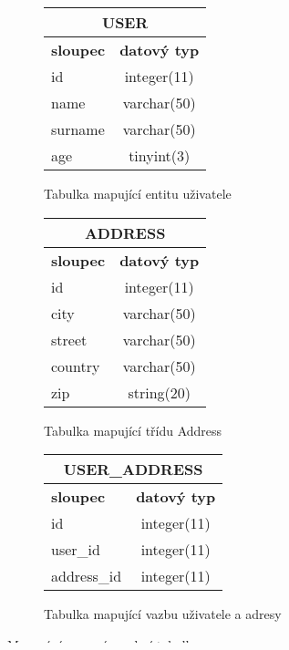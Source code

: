 \begin{figure}[!h]
\begin{subfigure}[b]{0.3\textwidth}
  \caption{Tabulka mapující entitu uživatele}
  \label{tab:user:bt}
    \centering
    \begin{tabular}{|l|c|}
       \hline
       \multicolumn{2}{|c|}{\textbf{USER}} \\
       \hline    
       \textbf{sloupec} & \textbf{datový typ} \\
       \hline
       id & integer(11) \\
       \hline
       name & varchar(50) \\
       \hline
       surname & varchar(50) \\
       \hline
       age & tinyint(3) \\
       \hline
    \end{tabular}
\end{subfigure}
\begin{subfigure}[b]{0.3\textwidth}
  \caption{Tabulka mapující třídu Address}
  \label{tab:address:bt}
    \centering
    \begin{tabular}{|l|c|}
       \hline
       \multicolumn{2}{|c|}{\textbf{ADDRESS}} \\
       \hline    
       \textbf{sloupec} & \textbf{datový typ} \\
       \hline
       id & integer(11) \\
       \hline
       city & varchar(50) \\
       \hline
       street & varchar(50) \\
       \hline
       country & varchar(50) \\
       \hline
       zip & string(20) \\
       \hline
    \end{tabular}
\end{subfigure}
\begin{subfigure}[b]{0.3\textwidth}
  \caption{Tabulka mapující vazbu uživatele a adresy}
  \label{tab:user:address}
    \centering
    \begin{tabular}{|l|c|}
       \hline
       \multicolumn{2}{|c|}{\textbf{USER\_ADDRESS}} \\
       \hline    
       \textbf{sloupec} & \textbf{datový typ} \\
       \hline
       id & integer(11) \\
       \hline
       user\_id & integer(11) \\
       \hline
       address\_id & integer(11) \\
       \hline
    \end{tabular}
\end{subfigure}
\caption{Mapování pomocí vazební tabulky}\label{fig:orm:bt}
\end{figure}

